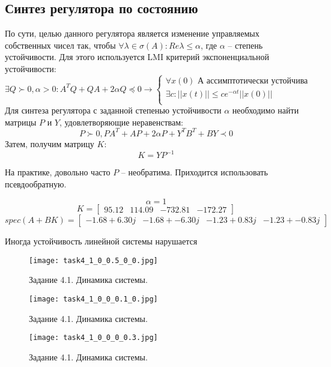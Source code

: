\subsection{Синтез регулятора по состоянию}
По сути, целью данного регулятора является изменение управляемых собственных чисел так, чтобы \(\forall \lambda \in \sigma(A): Re{\lambda} \leq \alpha\), где \(\alpha\) -- степень устойчивости.
Для этого используется LMI критерий экспоненциальной устойчивости:
\[ \exists Q \succ 0 , \alpha > 0 :  A^TQ + QA + 2 \alpha Q \preccurlyeq 0 \rightarrow
\begin{cases}
    \text{\(\forall x(0)\) А ассимптотически устойчива}\\
    \exists c :  ||x(t)|| \le  c e^{-\alpha t} ||x(0)|| \\
\end{cases}
\]
Для синтеза регулятора с заданной степенью устойчивости $\alpha$ необходимо найти матрицы $P$ и $Y$,
удовлетворяющие неравенствам:
\begin{equation}
    P \succ 0, PA^T + AP +2\alpha P + Y^TB^T + BY \prec 0
\end{equation}
Затем, получим матрицу $K$:
\begin{equation}
    K = YP^{-1}
\end{equation}

На практике, довольно часто \(P\) -- необратима. Приходится использовать псевдообратную.

\[\alpha = 1\]
\[K = \begin{bmatrix}
    95.12 &  114.09 & -732.81 & -172.27
  \end{bmatrix}\]
  \[spec(A + B K) = \begin{bmatrix}
   -1.68 + 6.30j & -1.68 + -6.30j & -1.23 + 0.83j & -1.23 + -0.83j
  \end{bmatrix}\]

  Иногда устойчивость линейной системы нарушается
  \begin{figure}[]
    \centering
    \texttt{[image: task4\_1\_0\_0.5\_0\_0.jpg]}
    \caption{Задание 4.1. Динамика системы.}
    \label{fig:task4_1_1}
\end{figure}

\begin{figure}[]
    \centering
    \texttt{[image: task4\_1\_0\_0\_0.1\_0.jpg]}
    \caption{Задание 4.1. Динамика системы.}
    \label{fig:task4_1_2}
\end{figure}

\begin{figure}[]
    \centering
    \texttt{[image: task4\_1\_0\_0\_0\_0.3.jpg]}
    \caption{Задание 4.1. Динамика системы.}
    \label{fig:task4_1_3}
\end{figure}

